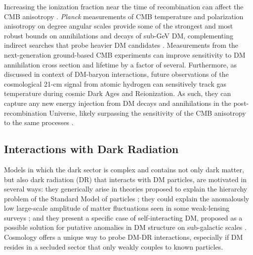 \documentclass[12pt]{article}
\begin{document}
Increasing the ionization fraction near the time of recombination can affect the CMB anisotropy \cite{Adams:1998nr,Chen:2003gz, Padmanabhan:2005es}. 
\textit{Planck} measurements of CMB temperature and polarization anisotropy on degree angular scales provide some of the strongest and most robust bounds on annihilations and decays of sub-GeV DM, complementing indirect searches that probe heavier DM candidates \cite{Aghanim:2018eyx,Slatyer:2016qyl}. 
Measurements from the next-generation ground-based CMB experiments can improve sensitivity to DM annihilation cross section and lifetime by a factor of several.
Furthermore, as discussed in context of DM-baryon interactions, future observations of the cosmological 21-cm signal from atomic hydrogen can sensitively track gas temperature during cosmic Dark Ages and Reionization.
As such, they can capture any new energy injection from DM decays and annihilations in the post-recombination Universe, likely surpassing the sensitivity of the CMB anisotropy to the same processes \cite{Furlanetto:2006wp,Valdes:2007cu,Evoli:2014pva,Lopez-Honorez:2016sur,Poulin:2016anj}. 

\vspace{-0.4cm}
\subsection{Interactions with Dark Radiation}

Models in which the dark sector is complex and contains not only dark matter, but also dark radiation (DR) that interacts with DM particles, are motivated in several ways: they generically arise in theories proposed to explain the hierarchy problem of the Standard Model of particles \cite{Arkani-Hamed:2016rle, Chacko:2018vss}; they could explain the anomalously low large-scale amplitude of matter fluctuations seen in some weak-lensing surveys \cite{Lesgourgues:2015wza,Chacko:2016kgg,Buen-Abad:2017gxg,Krall:2017xcw}; and they present a specific case of self-interacting DM, proposed as a possible solution for putative anomalies in DM structure on sub-galactic scales \cite{Tulin:2012wi,Tulin:2013teo,Kaplinghat:2015aga,Bullock:2017xww}. 
Cosmology offers a unique way to probe DM-DR interactions, especially if DM resides in a secluded sector that only weakly couples to known particles.
\end{document}
